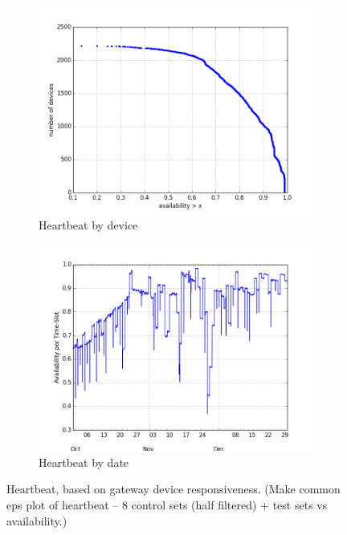 \begin{figure}[ht!]
\begin{minipage}{1\linewidth}
\centering
%
\begin{subfigure}[b]{0.5\linewidth}
\includegraphics[width=\linewidth]{figures/250-test_dw-availability-CDF.png}
  \caption{Heartbeat by device}
  \label{fig:availability-device}
\end{subfigure}
%
\hspace{-1em}
%
\begin{subfigure}[b]{0.5\linewidth}
\includegraphics[width=\linewidth]{figures/250-test_dw-availability-by-date.png}
  \caption{Heartbeat by date}
  \label{fig:availability-date}
\end{subfigure}
%
\end{minipage}
\caption{Heartbeat, based on gateway device responsiveness. (Make common eps 
plot of heartbeat -- 8 control sets (half filtered) + test sets vs 
availability.) }
\label{fig:availability}
\end{figure}



